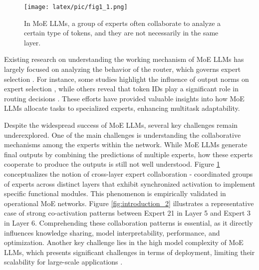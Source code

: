 \documentclass[11pt]{article}
\begin{document}
\setlength{\belowcaptionskip}{-0.3cm} %
\begin{figure}[t]
    \centering
    \texttt{[image: latex/pic/fig1\_1.png]}
    \caption{In MoE LLMs, a group of experts often collaborate to analyze a certain type of tokens, and they are not necessarily in the same layer.}
    \label{fig:expert_collaboration}
\end{figure}

Existing research on understanding the working mechanism of MoE LLMs has largely focused on analyzing the behavior of the router, which governs expert selection \cite{lo_closer_2024}. For instance, some studies highlight the influence of output norms on expert selection \cite{lo_closer_2024}, while others reveal that token IDs play a significant role in routing decisions \cite{jiang_mixtral_2024, xue_openmoe_2024, dai_deepseekmoe_2024}. These efforts have provided valuable insights into how MoE LLMs allocate tasks to specialized experts, enhancing multitask adaptability.

Despite  the widespread success of MoE LLMs, several key challenges remain underexplored. One of the main challenges is understanding the collaborative mechanisms among the experts within the network. While MoE LLMs generate final outputs by combining the predictions of multiple experts,  how these experts cooperate to produce the outputs is still not well understood. 
Figure \ref{fig:expert_collaboration} conceptualizes the notion of cross-layer expert collaboration - coordinated groups of experts across distinct layers that exhibit synchronized activation to implement specific functional modules. This phenomenon is empirically validated in operational MoE networks. Figure \ref{fig:introduction_2}  illustrates a representative case of strong co-activation patterns between Expert 21 in Layer 5 and Expert 3 in Layer 6.
Comprehending these collaboration patterns is essential, as it directly influences knowledge sharing, model interpretability, performance, and optimization. Another key challenge lies in the high model complexity of MoE LLMs, which presents significant challenges in terms of deployment, limiting their scalability for large-scale applications \cite{lu_not_2024,he_demystifying_2024}. 
\end{document}
